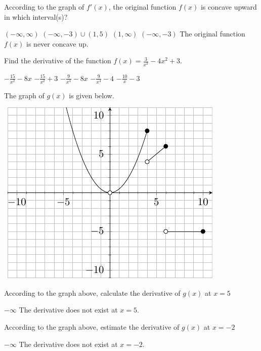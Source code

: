 \documentclass[11pt]{article}
\begin{document}
\begin{questions}
\begin{multiplechoice}{5}
\question According to the graph of $f'(x)$, the original function $f(x)$ is concave upward in which interval(s)?
\begin{answers}{2}
\ans $(-\infty, \infty)$
\ans $(-\infty, -3) \cup (1,5)$
\ans $(1, \infty)$
\ans $(-\infty, -3)$
\ans The original function $f(x)$ is never concave up.
\end{answers}


\question Find the derivative of the function $f(x) = \frac{3}{x^3} - 4x^2 + 3$.
\begin{answers}{2}
\ans $-\frac{15}{x^2} - 8x$
\ans $-\frac{15}{x^2} + 3$
\ans $-\frac{9}{x^4} -8x$
\ans $-\frac{9}{x^4} - 4$
\ans $-\frac{10}{x} - 3$
\end{answers}

\newpage

The graph of $g(x)$ is given below.\\

\begin{minipage}{\linewidth}%
\centering
\makebox[\linewidth]{}
\includegraphics{exam2graph2.pdf}
\label{graph2exam1}%
\end{minipage}
\question According to the graph above, calculate the derivative of $g(x)$ at $x = 5$
\begin{answers}{2}
\ans $-\infty$
\ans The derivative does not exist at $x=5$.
\end{answers}

\question According to the graph above, estimate the derivative of $g(x)$ at $x = -2$
\begin{answers}{2}
\ans $-\infty$
\ans The derivative does not exist at $x= -2$.
\end{answers}



\end{multiplechoice}
\end{questions}
\end{document}
